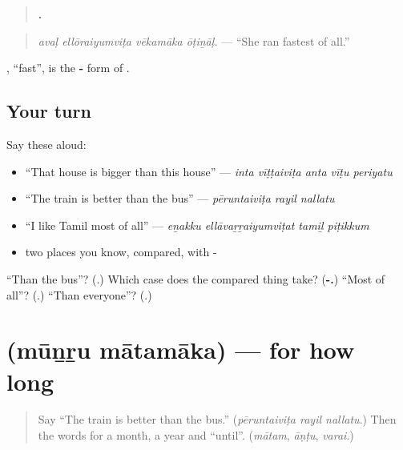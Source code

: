 \begin{quote}
\textbf{   .}
\end{quote}

\begin{quote}
\emph{avaḷ ellōraiyumviṭa vēkamāka ōṭiṉāḷ.} — \textquotedblleft{}She ran fastest of all.\textquotedblright{}
\end{quote}

\textbf{}, \textquotedblleft{}fast\textquotedblright{}, is the \textbf{-} form of \textbf{}.

\subsection*{Your turn}
Say these aloud:

\begin{itemize}
\raggedright
  \item \textquotedblleft{}That house is bigger than this house\textquotedblright{} — \emph{inta vīṭṭaiviṭa anta vīṭu periyatu}
  \item \textquotedblleft{}The train is better than the bus\textquotedblright{} — \emph{pēruntaiviṭa rayil nallatu}
  \item \textquotedblleft{}I like Tamil most of all\textquotedblright{} — \emph{eṉakku ellāvaṟṟaiyumviṭat tamiḻ piṭikkum}
  \item two places you know, compared, with -
\end{itemize}

\begin{tcolorbox}[breakable,colback=teal!4,colframe=teal!35!black,title={Before you move on}]
\textquotedblleft{}Than the bus\textquotedblright{}? (\textbf{}.) Which case does the compared thing take? (\textbf{-.}) \textquotedblleft{}Most of all\textquotedblright{}? (\textbf{}.) \textquotedblleft{}Than everyone\textquotedblright{}? (\textbf{}.)
\end{tcolorbox}
\section[\texorpdfstring{\ta{மூன்று} \ta{மாதமாக} (mūṉṟu mātamāka)}{மூன்று மாதமாக (mūṉṟu mātamāka)}]{  (mūṉṟu mātamāka) — for how long}

\label{lesson:TA-C291-matamaka}



\begin{quote}
Say \textquotedblleft{}The train is better than the bus.\textquotedblright{} (\emph{pēruntaiviṭa rayil nallatu}.) Then the words for a month, a year and \textquotedblleft{}until\textquotedblright{}. (\emph{mātam}, \emph{āṇṭu}, \emph{varai}.)
\end{quote}

